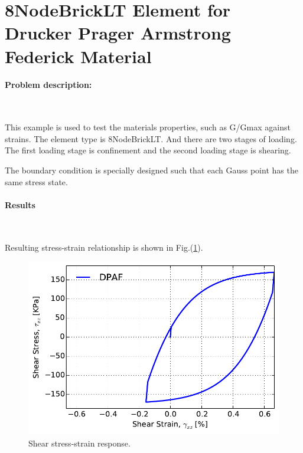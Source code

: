 \documentclass[fleqn,11pt]{article}
\begin{document}
\section{8NodeBrickLT Element for Drucker Prager Armstrong Federick Material}

\paragraph{Problem description:} ~

This example is used to test the materials properties, such as G/Gmax against strains. The element type is 8NodeBrickLT. And there are two stages of loading. The first loading stage is confinement and the second loading stage is shearing. 

The boundary condition is specially designed such that each Gauss point has the same stress state. 





\paragraph{Results} ~

Resulting stress-strain relationship is shown in Fig.(\ref{fig_8nodebrick_result}). 

\begin{figure}[!htb]
  \centering
  \includegraphics[width=12cm]{../Figure-files/_Chapter_Appendix_Illustrative_Examples/drucker_prager_armstrong_federick.pdf}
  \caption{Shear stress-strain response.}
  \label{fig_8nodebrick_result}
\end{figure}
\end{document}
